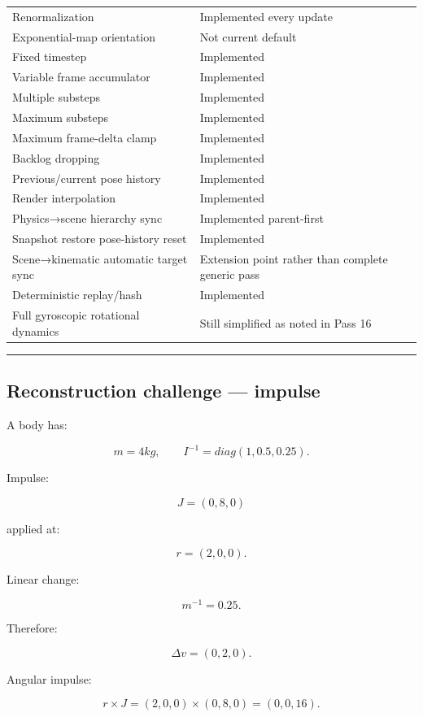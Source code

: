 {\begin{longtable}[]{@{}
  >{\raggedright\arraybackslash}p{}
  >{\raggedright\arraybackslash}p{}@{}}
Renormalization & Implemented every update \\
Exponential-map orientation & Not current default \\
Fixed timestep & Implemented \\
Variable frame accumulator & Implemented \\
Multiple substeps & Implemented \\
Maximum substeps & Implemented \\
Maximum frame-delta clamp & Implemented \\
Backlog dropping & Implemented \\
Previous/current pose history & Implemented \\
Render interpolation & Implemented \\
Physics→scene hierarchy sync & Implemented parent-first \\
Snapshot restore pose-history reset & Implemented \\
Scene→kinematic automatic target sync & Extension point rather than complete generic pass \\
Deterministic replay/hash & Implemented \\
Full gyroscopic rotational dynamics & Still simplified as noted in Pass 16 \\
\end{longtable}
}

\begin{center}\rule{0.5\linewidth}{0.5pt}\end{center}

\subsection{Reconstruction challenge --- impulse}\label{06-engine-ii-ch038-reconstruction-challenge-impulse}

A body has:

\[
m=4kg,
\qquad
I^{-1}
=
diag(1,0.5,0.25).
\]

Impulse:

\[
J=(0,8,0)
\]

applied at:

\[
r=(2,0,0).
\]

Linear change:

\[
m^{-1}=0.25.
\]

Therefore:

\[
\Delta v
=
(0,2,0).
\]

Angular impulse:

\[
r\times J
=
(2,0,0)
\times
(0,8,0)
=
(0,0,16).
\]

